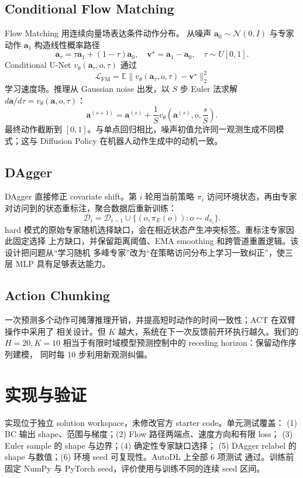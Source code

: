 \documentclass[10pt,twocolumn,a4paper]{ctexart}
\begin{document}
\subsection{Conditional Flow Matching}
Flow Matching 用连续向量场表达条件动作分布\citep{lipman2023flow,tong2024improving}。
从噪声 $\bm a_0\sim\mathcal N(0,I)$ 与专家动作 $\bm a_1$ 构造线性概率路径
\[
  \bm a_\tau=\tau\bm a_1+(1-\tau)\bm a_0,\quad
  \bm v^\star=\bm a_1-\bm a_0,\quad \tau\sim U[0,1].
\]
Conditional U-Net $v_\theta(\bm a_\tau,o,\tau)$ 通过
\[
  \mathcal L_{\mathrm{FM}}=
  \mathbb E\|v_\theta(\bm a_\tau,o,\tau)-\bm v^\star\|_2^2
\]
学习速度场。推理从 Gaussian noise 出发，以 $S$ 步 Euler 法求解
$d\bm a/d\tau=v_\theta(\bm a,o,\tau)$：
\[
  \bm a^{(s+1)}=\bm a^{(s)}+\frac{1}{S}
  v_\theta\!\left(\bm a^{(s)},o,\frac{s}{S}\right).
\]
最终动作截断到 $[0,1]$。与单点回归相比，噪声初值允许同一观测生成不同模式；这与
Diffusion Policy 在机器人动作生成中的动机一致\citep{chi2023diffusion}。

\subsection{DAgger}
DAgger 直接修正 covariate shift\citep{ross2011dagger}。第 $i$ 轮用当前策略
$\pi_i$ 访问环境状态，再由专家对访问到的状态重标注，聚合数据后重新训练：
\[
  \mathcal D_i=\mathcal D_{i-1}\cup
  \{(o,\pi_E(o)):o\sim d_{\pi_i}\}.
\]
hard 模式的原始专家随机选择缺口，会在相近状态产生冲突标签。重标注专家因此固定选择
上方缺口，并保留距离阈值、EMA smoothing 和跨管道重置逻辑。该设计把问题从“学习随机
多峰专家”改为“在策略访问分布上学习一致纠正”，使三层 MLP 具有足够表达能力。

\subsection{Action Chunking}
一次预测多个动作可摊薄推理开销，并提高短时动作的时间一致性；ACT 在双臂操作中采用了
相关设计\citep{zhao2023act}。但 $K$ 越大，系统在下一次反馈前开环执行越久。我们的
$H=20,K=10$ 相当于有限时域模型预测控制中的 receding horizon：保留动作序列建模，
同时每 10 步利用新观测纠偏。

\section{实现与验证}
实现位于独立 solution workspace，未修改官方 starter code。单元测试覆盖：
(1) BC 输出 shape、范围与梯度；(2) Flow 路径两端点、速度方向和有限 loss；
(3) Euler sample 的 shape 与边界；(4) 确定性专家缺口选择；
(5) DAgger relabel 的 shape 与数值；(6) 环境 seed 可复现性。AutoDL 上全部 6 项测试
通过。训练前固定 NumPy 与 PyTorch seed，评价使用与训练不同的连续 seed 区间。
\end{document}
